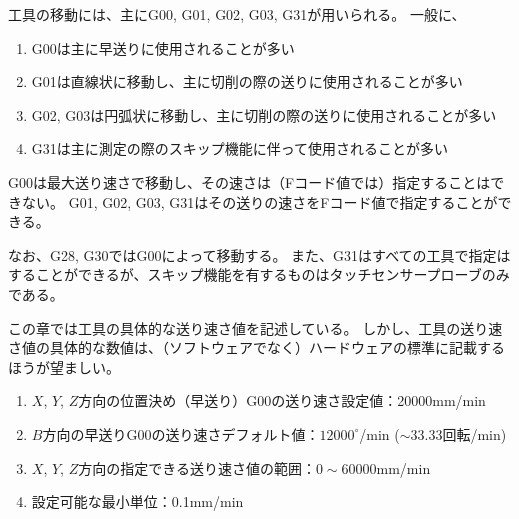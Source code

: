 


工具の移動には、主に{\ttfamily G00}, {\ttfamily G01}, {\ttfamily G02}, {\ttfamily G03}, {\ttfamily G31}が用いられる。
一般に、
\begin{enumerate}
\item {\ttfamily G00}は主に早送りに使用されることが多い
\item {\ttfamily G01}は直線状に移動し、主に切削の際の送りに使用されることが多い
\item {\ttfamily G02}, {\ttfamily G03}は円弧状に移動し、主に切削の際の送りに使用されることが多い
\item {\ttfamily G31}は主に測定の際のスキップ機能に伴って使用されることが多い
\end{enumerate}
{\ttfamily G00}は最大送り速さで移動し、その速さは（Fコード値では）指定することはできない。
{\ttfamily G01}, {\ttfamily G02}, {\ttfamily G03}, {\ttfamily G31}はその送りの速さをFコード値で指定することができる。

なお、{\ttfamily G28}, {\ttfamily G30}では{\ttfamily G00}によって移動する。
また、{\ttfamily G31}はすべての工具で指定はすることができるが、スキップ機能を有するものはタッチセンサープローブのみである。
\begin{marker}
この章では工具の具体的な送り速さ値を記述している。
しかし、工具の送り速さ値の具体的な数値は、（ソフトウェアでなく）ハードウェアの標準に記載するほうが望ましい。
\end{marker}



\begin{enumerate}
\item $X$, $Y$, $Z$方向の位置決め（早送り）{\ttfamily G00}の送り速さ設定値：20000mm/min
\item $B$方向の早送り{\ttfamily G00}の送り速さデフォルト値：$12000^\circ$/min ($\sim 33.33$回転/min)
\item $X$, $Y$, $Z$方向の指定できる送り速さ値の範囲：$0\sim60000$mm/min
\item 設定可能な最小単位：0.1mm/min
\end{enumerate}



